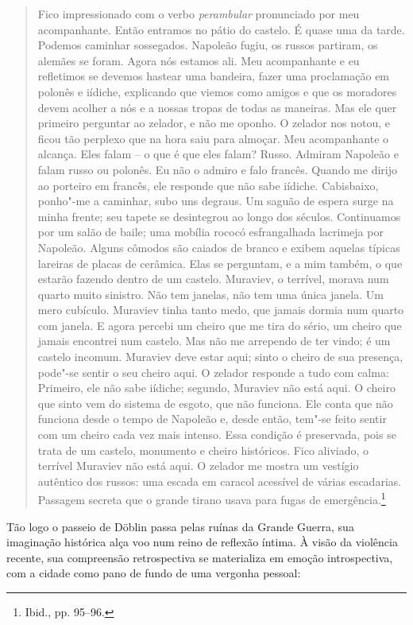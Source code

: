 \begin{quote}
Fico impressionado com o verbo \textit{perambular} pronunciado por meu
acompanhante. Então entramos no pátio do castelo. É quase uma da tarde.
Podemos caminhar sossegados. Napoleão fugiu, os russos partiram, os
alemães se foram. Agora nós estamos ali. Meu acompanhante e eu
refletimos se devemos hastear uma bandeira, fazer uma proclamação em
polonês e iídiche, explicando que viemos como amigos e que os moradores
devem acolher a nós e a nossas tropas de todas as maneiras. Mas ele quer
primeiro perguntar ao zelador, e não me oponho. O zelador nos notou, e
ficou tão perplexo que na hora saiu para almoçar. Meu acompanhante o
alcança. Eles falam -- o que é que eles falam? Russo. Admiram Napoleão e
falam russo ou polonês. Eu não o admiro e falo francês. Quando me dirijo
ao porteiro em francês, ele responde que não sabe iídiche. Cabisbaixo,
ponho"-me a caminhar, subo uns degraus. Um saguão de espera surge na
minha frente; seu tapete se desintegrou ao longo dos séculos.
Continuamos por um salão de baile; uma mobília rococó esfrangalhada
lacrimeja por Napoleão. Alguns cômodos são caiados de branco e exibem
aquelas típicas lareiras de placas de cerâmica. Elas se perguntam, e a
mim também, o que estarão fazendo dentro de um castelo. Muraviev, o
terrível, morava num quarto muito sinistro. Não tem janelas, não tem uma
única janela. Um mero cubículo. Muraviev tinha tanto medo, que jamais
dormia num quarto com janela. E agora percebi um cheiro que me tira do
sério, um cheiro que jamais encontrei num castelo. Mas não me arrependo
de ter vindo; é um castelo incomum. Muraviev deve estar aqui; sinto o
cheiro de sua presença, pode"-se sentir o seu cheiro aqui. O zelador
responde a tudo com calma: Primeiro, ele não sabe iídiche; segundo,
Muraviev não está aqui. O cheiro que sinto vem do sistema de esgoto, que
não funciona. Ele conta que não funciona desde o tempo de Napoleão e,
desde então, tem"-se feito sentir com um cheiro cada vez mais intenso.
Essa condição é preservada, pois se trata de um castelo, monumento e
cheiro históricos. Fico aliviado, o terrível Muraviev não está aqui. O
zelador me mostra um vestígio autêntico dos russos: uma escada em
caracol acessível de várias escadarias. Passagem secreta que o grande
tirano usava para fugas de emergência.\footnote{Ibid., pp. 95--96.}
\end{quote}

Tão logo o passeio de Döblin passa pelas ruínas da Grande Guerra, sua
imaginação histórica alça voo num reino de reflexão íntima. À visão da
violência recente, sua compreensão retrospectiva se materializa em
emoção introspectiva, com a cidade como pano de fundo de uma vergonha
pessoal:


